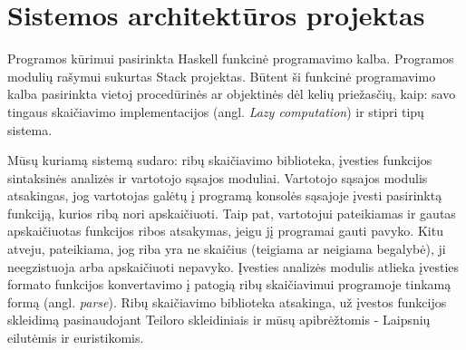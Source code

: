 \section{Sistemos architektūros projektas}

Programos kūrimui pasirinkta Haskell funkcinė programavimo kalba.
Programos modulių rašymui sukurtas Stack projektas. 
Būtent ši funkcinė programavimo kalba pasirinkta vietoj procedūrinės ar objektinės dėl kelių priežasčių, kaip: 
savo tingaus skaičiavimo implementacijos (angl. \textit{Lazy computation}) ir stipri tipų sistema. 
 
Mūsų kuriamą sistemą sudaro: ribų skaičiavimo biblioteka, įvesties funkcijos sintaksinės analizės ir vartotojo sąsajos moduliai. 
Vartotojo sąsajos modulis atsakingas, jog vartotojas galėtų į programą konsolės sąsajoje 
įvesti pasirinktą funkciją, kurios ribą nori apskaičiuoti. 
Taip pat, vartotojui pateikiamas ir gautas apskaičiuotas funkcijos ribos atsakymas, jeigu jį programai gauti pavyko. 
Kitu atveju, pateikiama, jog riba yra ne skaičius (teigiama ar neigiama begalybė), ji neegzistuoja arba apskaičiuoti nepavyko.
Įvesties analizės modulis atlieka įvesties formato funkcijos konvertavimo į 
patogią ribų skaičiavimui programoje tinkamą formą (angl. \textit{parse}). 
Ribų skaičiavimo biblioteka atsakinga, už įvestos funkcijos skleidimą pasinaudojant Teiloro skleidiniais ir
mūsų apibrėžtomis - Laipsnių eilutėmis ir euristikomis.


